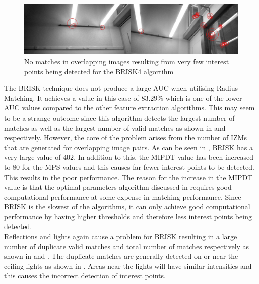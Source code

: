 \documentclass[11pt]{report}
\begin{document}
\begin{figure}
  \centering
    \includegraphics[width=1.0\textwidth]{../Drawings/Matching/noMatchesBrisk4.jpg}
    \caption{No matches in overlapping images resulting from very few interest points being detected for the BRISK4 algortihm }
    \label{fig:noMatchesBrisk4}
\end{figure}

The BRISK technique does not produce a large AUC when utilising Radius Matching. It achieves a  value in this case of $83.29\%$ which is one of the lower AUC values compared to the other feature extraction algorithms. This may seem to be a strange outcome since this algorithm detects the largest number of matches as well as the largest number of valid matches as shown in  and  respectively. However, the core of the problem arises from the number of IZMs that are generated for overlapping image pairs. As can be seen in , BRISK has a very large value of $402$. In addition to this, the MIPDT value has been increased to $80$ for the MPS values and this causes far fewer interest points to be detected. This results in the poor performance. The reason for the increase in the MIPDT value is that the optimal parameters algorithm discussed in  requires good computational performance at some expense in matching performance. Since BRISK is the slowest of the algorithms, it can only achieve good computational performance by having higher thresholds and therefore less interest points being detected.\\

Reflections and lights again cause a problem for BRISK resulting in a large number of duplicate valid matches and total number of matches respectively as shown in  and . The duplicate matches are generally detected on or near the ceiling lights as shown in . Areas near the lights will have similar intensities and this causes the incorrect detection of interest points.\\
\end{document}
